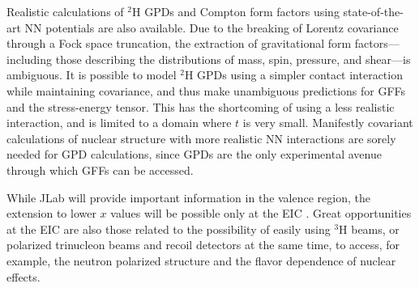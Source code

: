 Realistic calculations of $^2$H GPDs and Compton form factors using
state-of-the-art NN potentials are also available\cite{Cano:2003ju}.
Due to the breaking of Lorentz covariance through a Fock space truncation,
the extraction of gravitational form factors---including those describing
the distributions of mass, spin, pressure, and shear---is ambiguous.
It is possible to model $^2$H GPDs using
a simpler contact interaction while maintaining covariance, and thus
make unambiguous predictions for GFFs and the stress-energy tensor.
This has the shortcoming of using a less realistic interaction,
and is limited to a domain where $t$ is very small. Manifestly covariant
calculations of nuclear structure with more realistic NN interactions
are sorely needed for GPD calculations, since GPDs are the only experimental
avenue through which GFFs can be accessed.
  
While JLab will provide important information
in the valence region, the extension to lower
$x$ values will be possible only at the EIC \cite{Accardi:2012qut}. 
Great opportunities at the EIC are also those related to the possibility
of easily using $^3$H beams, or polarized trinucleon beams and 
recoil detectors at the same time, to access, for example, 
the neutron polarized structure and the flavor dependence 
of nuclear effects.





